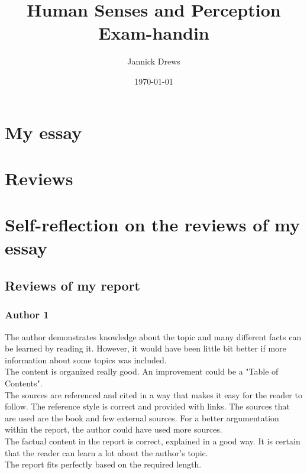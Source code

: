 \documentclass{article}
\title{Human Senses and Perception Exam-handin}
\author{Jannick Drews}
\date{\today}
\begin{document}
\maketitle
\newpage

\section{My essay}


\section{Reviews}
\small


\newpage

\newpage
\section{Self-reflection on the reviews of my essay}
\subsection{Reviews of my report}
\subsubsection{Author 1}

The author demonstrates knowledge about the topic and many different facts can be learned by reading it. However, it would have been little bit better if more information about some topics was included.\\

The content is organized really good. An improvement could be a "Table of Contents".\\

The sources are referenced and cited in a way that makes it easy for the reader to follow. The reference style is correct and provided with links. The sources that are used are the book and few external sources. For a better argumentation within the report, the author could have used more sources.\\

The factual content in the report is correct, explained in a good way. It is certain that the reader can learn a lot about the author’s topic.\\

The report fits perfectly based on the required length.\\
\end{document}
